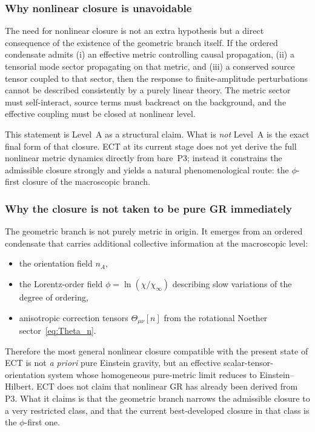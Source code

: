 \subsubsection*{Why nonlinear closure is unavoidable}

The need for nonlinear closure is not an extra hypothesis but a direct
consequence of the existence of the geometric branch itself.
If the ordered condensate admits (i) an effective metric controlling
causal propagation, (ii) a tensorial mode sector propagating on that
metric, and (iii) a conserved source tensor coupled to that sector,
then the response to finite-amplitude perturbations cannot be described
consistently by a purely linear theory.
The metric sector must self-interact, source terms must backreact on the
background, and the effective coupling must be closed at nonlinear level.

This statement is Level~A as a structural claim.
What is \emph{not} Level~A is the exact final form of that closure.
ECT at its current stage does not yet derive the full nonlinear metric
dynamics directly from bare~P3; instead it constrains the admissible
closure strongly and yields a natural phenomenological route:
the $\phi$-first closure of the macroscopic branch.

\subsubsection*{Why the closure is not taken to be pure GR immediately}

The geometric branch is not purely metric in origin.
It emerges from an ordered condensate that carries additional collective
information at the macroscopic level:
\begin{itemize}
  \item the orientation field $n_A$,
  \item the Lorentz-order field $\phi=\ln(\chi/\chi_\infty)$
    describing slow variations of the degree of ordering,
  \item anisotropic correction tensors $\Theta_{\mu\nu}[n]$
    from the rotational Noether sector~\eqref{eq:Theta_n}.
\end{itemize}
Therefore the most general nonlinear closure compatible with the present
state of ECT is not \emph{a priori} pure Einstein gravity, but an
effective scalar-tensor-orientation system whose homogeneous
pure-metric limit reduces to Einstein--Hilbert.
ECT does not claim that nonlinear GR has already been derived from P3.
What it claims is that the geometric branch narrows the admissible
closure to a very restricted class, and that the current best-developed
closure in that class is the $\phi$-first one.

